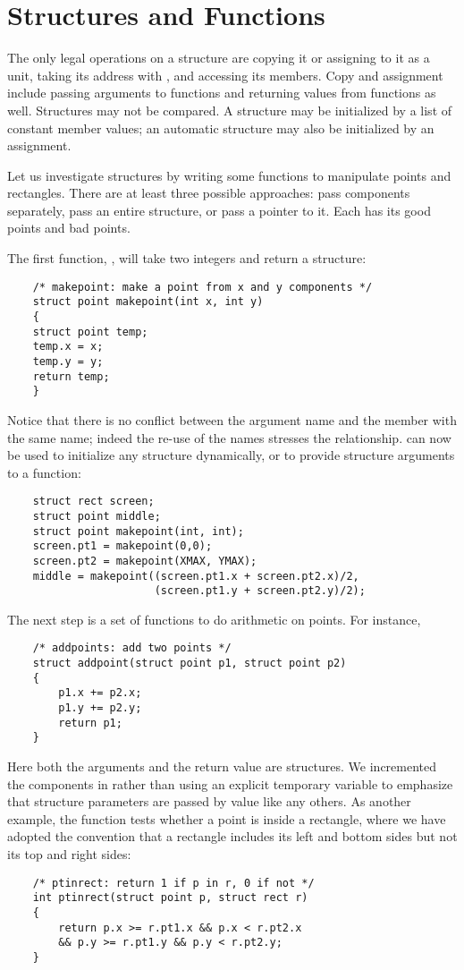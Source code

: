 \section{Structures and Functions}


The only legal operations on a structure are copying it or assigning to it as a unit, taking its address with \code{\&}, and accessing its members.
Copy and assignment include passing arguments to functions and returning values from functions as well.
Structures may not be compared. A structure may be initialized by a list of constant member values; an automatic structure may also be initialized by an assignment.

Let us investigate structures by writing some functions to manipulate points and rectangles.
There are at least three possible approaches: pass components separately, pass an entire structure, or pass a pointer to it. Each has its good points and bad points.

The first function, , will take two integers and return a  structure:
\begin{lstlisting}
	/* makepoint: make a point from x and y components */
	struct point makepoint(int x, int y)
	{
	struct point temp;
	temp.x = x;
	temp.y = y;
	return temp;
	}
\end{lstlisting}

Notice that there is no conflict between the argument name and the member with the same name; indeed the re-use of the names stresses the relationship.
 can now be used to initialize any structure dynamically, or to provide structure arguments to a function:
\begin{lstlisting}
	struct rect screen;
	struct point middle;
	struct point makepoint(int, int);
	screen.pt1 = makepoint(0,0);
	screen.pt2 = makepoint(XMAX, YMAX);
	middle = makepoint((screen.pt1.x + screen.pt2.x)/2,
					   (screen.pt1.y + screen.pt2.y)/2);
\end{lstlisting}

The next step is a set of functions to do arithmetic on points. For instance,
\begin{lstlisting}
	/* addpoints: add two points */
	struct addpoint(struct point p1, struct point p2)
	{
		p1.x += p2.x;
		p1.y += p2.y;
		return p1;
	}
\end{lstlisting}
Here both the arguments and the return value are structures.
We incremented the components in  rather than using an explicit temporary variable to emphasize that structure parameters are passed by value like any others.
As another example, the function  tests whether a point is inside a rectangle,
where we have adopted the convention that a rectangle includes its left and bottom sides but not its top and right sides:
\begin{lstlisting}
	/* ptinrect: return 1 if p in r, 0 if not */
	int ptinrect(struct point p, struct rect r)
	{
		return p.x >= r.pt1.x && p.x < r.pt2.x
		&& p.y >= r.pt1.y && p.y < r.pt2.y;
	}
\end{lstlisting}

